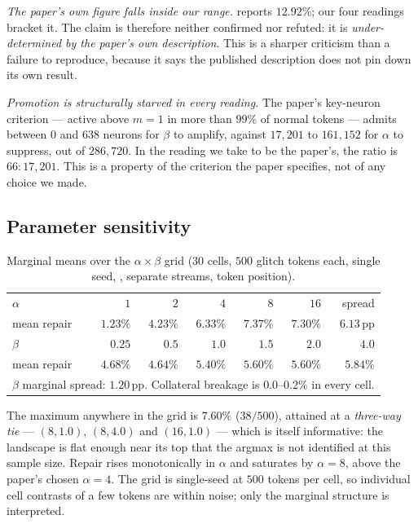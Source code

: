 \emph{The paper's own figure falls inside our range.} \gp{} reports $12.92\%$;
our four readings bracket it. The claim is therefore neither confirmed nor
refuted: it is \emph{under-determined by the paper's own description}. This is a
sharper criticism than a failure to reproduce, because it says the published
description does not pin down its own result.

\emph{Promotion is structurally starved in every reading.} The paper's key-neuron
criterion --- active above $m = 1$ in more than $99\%$ of normal tokens --- admits
between $0$ and $638$ neurons for $\beta$ to amplify, against $17{,}201$ to
$161{,}152$ for $\alpha$ to suppress, out of $286{,}720$. In the reading we take
to be the paper's, the ratio is $66 : 17{,}201$. This is a property of the
criterion the paper specifies, not of any choice we made.

\subsection{Parameter sensitivity}

\begin{table}[h]
\centering
\caption{Marginal means over the $\alpha \times \beta$ grid ($30$ cells, $500$
glitch tokens each, single seed, \Ppaper{}, separate streams, token position).}
\label{tab:grid}
\begin{tabular}{lrrrrrr}
\toprule
$\alpha$ & $1$ & $2$ & $4$ & $8$ & $16$ & spread \\
mean repair & $1.23\%$ & $4.23\%$ & $6.33\%$ & $7.37\%$ & $7.30\%$ & $6.13$\,pp \\
\midrule
$\beta$ & $0.25$ & $0.5$ & $1.0$ & $1.5$ & $2.0$ & $4.0$ \\
mean repair & $4.68\%$ & $4.64\%$ & $5.40\%$ & $5.60\%$ & $5.60\%$ & $5.84\%$ \\
\bottomrule
\multicolumn{7}{l}{\footnotesize $\beta$ marginal spread: $1.20$\,pp. Collateral
breakage is $0.0$--$0.2\%$ in every cell.}
\end{tabular}
\end{table}

The maximum anywhere in the grid is $7.60\%$ ($38/500$), attained at a
\emph{three-way tie} --- $(8, 1.0)$, $(8, 4.0)$ and $(16, 1.0)$ --- which is
itself informative: the landscape is flat enough near its top that the argmax is
not identified at this sample size. Repair rises monotonically in $\alpha$ and
saturates by $\alpha = 8$, above the paper's chosen $\alpha = 4$. The grid is
single-seed at $500$ tokens per cell, so individual cell contrasts of a few
tokens are within noise; only the marginal structure is interpreted.

